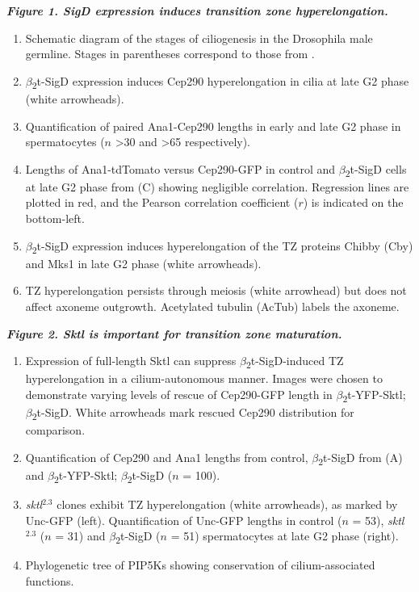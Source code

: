 \documentclass[12pt, twoside, letterpaper]{article}
\newcommand{\sigd}{$\beta$\textsubscript{2}t-SigD}
\begin{document}
\begin{doublespacing}
\begin{linenumbers}
    \textbf{\itshape Figure 1. SigD expression induces transition zone hyperelongation.}
    \begin{enumerate}[label={(\Alph*)}, nolistsep]
    \item Schematic diagram of the stages of ciliogenesis in the Drosophila male germline.
      Stages in parentheses correspond to those from \citep{cenci1994chromatin}.
    \item \sigd{} expression induces Cep290 hyperelongation in cilia at late G2 phase (white arrowheads).
    \item Quantification of paired Ana1-Cep290 lengths in early and late G2 phase in spermatocytes ($n$ >30 and >65 respectively).
    \item Lengths of Ana1-tdTomato versus Cep290-GFP in control and \sigd{} cells at late G2 phase from (C) showing negligible correlation.
      Regression lines are plotted in red, and the Pearson correlation coefficient ($r$) is indicated on the bottom-left.
    \item \sigd{} expression induces hyperelongation of the TZ proteins Chibby (Cby) and Mks1 in late G2 phase (white arrowheads).
    \item TZ hyperelongation persists through meiosis (white arrowhead) but does not affect
      axoneme outgrowth. Acetylated tubulin (AcTub) labels the axoneme.
    \end{enumerate}
    \bigskip
    \textbf{\itshape Figure 2. Sktl is important for transition zone maturation.}
    \begin{enumerate}[label={(\Alph*)}, nolistsep]
    \item Expression of full-length Sktl can suppress \sigd{}-induced TZ hyperelongation in a cilium-autonomous manner.
      Images were chosen to demonstrate varying levels of rescue of Cep290-GFP length in $\beta$\textsubscript{2}t-YFP-Sktl; \sigd{}.
      White arrowheads mark rescued Cep290 distribution for comparison.
    \item Quantification of Cep290 and Ana1 lengths from control, \sigd{} from (A) and $\beta$\textsubscript{2}t-YFP-Sktl; \sigd{} ($n$ = 100).
    \item \textit{sktl}$^{2.3}$ clones exhibit TZ hyperelongation (white arrowheads), as marked by
      Unc-GFP (left). Quantification of Unc-GFP lengths in control ($n$ = 53), \textit{sktl}$^{2.3}$ ($n$ = 31) and \sigd{}  ($n$ = 51)
      spermatocytes at late G2 phase (right).
    \item Phylogenetic tree of PIP5Ks showing conservation of cilium-associated functions.

\end{enumerate}
\end{linenumbers}
\end{doublespacing}
\end{document}

